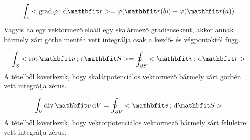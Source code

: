 \documentclass[lang=magyar]{math-handout}
\begin{document}
\vfill

\begin{block}
  \[
    \int_\gamma \scalar{\grad \varphi}{\diff \rvec r}
    =
    \varphi(\rvec r(b)) - \varphi(\rvec r(a))
  \]
  Vagyis ha egy vektormező előáll egy skalármező gradienseként, akkor annak
  bármely zárt görbe mentén vett integrálja csak a kezdő- és végpontoktól függ.

  \[
    \int_S \scalar{\rot \rvec v}{\diff \rvec S}
    =
    \oint_{\partial S} \scalar{\rvec v}{\diff \rvec r}
  \]
  A tételből következik, hogy skalárpotenciálos vektormező bármely zárt görbén
  vett integrálja zérus.

  \[
    \int_V \Div \rvec v \, \diff V
    =
    \oint_{\partial V} \scalar{\rvec v}{\diff \rvec S}
  \]
  A tételből következik, hogy vektorpotenciálos vektormező bármely zárt
  felületre vett integrálja zérus.
\end{block}
\end{document}
